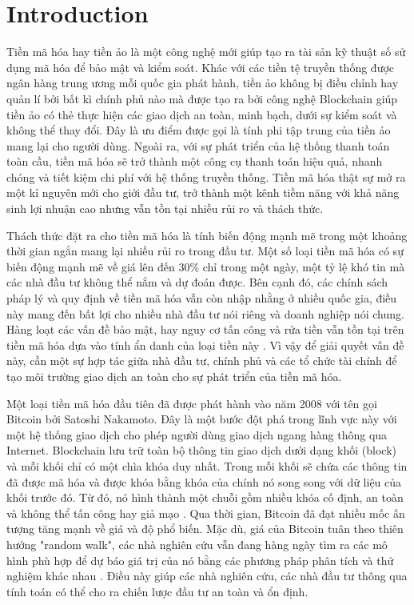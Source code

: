 \documentclass{ieeeojies}
\begin{document}
\titlepgskip=-15pt

\maketitle

\section{Introduction}
\label{sec:introduction}    
Tiền mã hóa hay tiền ảo là một công nghệ mới giúp tạo ra tài sản kỹ thuật số sử dụng mã hóa để bảo mật và kiểm soát. Khác với các tiền tệ truyền thống được ngân hàng trung ương mỗi quốc gia phát hành, tiền ảo không bị điều chỉnh hay quản lí bởi bất kì chính phủ nào mà được tạo ra bởi công nghệ Blockchain giúp tiền ảo có thẻ thực hiện các giao dịch an toàn, minh bạch, dưới sự kiểm soát và không thể thay đổi. Đây là ưu điểm được gọi là tính phi tập trung của tiền ảo mang lại cho người dùng. Ngoài ra, với sự phát triển của hệ thống thanh toán toàn cầu, tiền mã hóa sẽ trở thành một công cụ thanh toán hiệu quả, nhanh chóng và tiết kiệm chi phí với hệ thống truyền thống\cite{b1}. Tiền mã hóa thật sự mở ra một kỉ nguyên mới cho giới đầu tư, trở thành một kênh tiềm năng với khả năng sinh lợi nhuận cao nhưng vẫn tồn tại nhiều rủi ro và thách thức.

Thách thức đặt ra cho tiền mã hóa là tính biến động mạnh mẽ trong một khoảng thời gian ngắn mang lại nhiều rủi ro trong đầu tư. Một số loại tiền mã hóa có sự biến động mạnh mẽ về giá lên đến 30\% chỉ trong một ngày, một tỷ lệ khó tin mà các nhà đầu tư không thể nắm và dự đoán được. Bên cạnh đó, các chính sách pháp lý và quy định về tiền mã hóa vẫn còn nhập nhằng ở nhiều quốc gia, điều này mang đến bất lợi cho nhiều nhà đầu tư nói riêng và doanh nghiệp nói chung. Hàng loạt các vấn đề bảo mật, hay nguy cơ tấn công và rửa tiền vẫn tồn tại trên tiền mã hóa dựa vào tính ẩn danh của loại tiền này \cite{b2}. Vì vậy để giải quyết vấn đề này, cần một sự hợp tác giữa nhà đầu tư, chính phủ và các tổ chức tài chính để tạo môi trường giao dịch an toàn cho sự phát triển của tiền mã hóa.

Một loại tiền mã hóa đầu tiên đã được phát hành vào năm 2008 với tên gọi Bitcoin bởi Satoshi Nakamoto. Đây là một bước đột phá trong lĩnh vực này với một hệ thống giao dịch cho phép người dùng giao dịch ngang hàng thông qua Internet. Blockchain lưu trữ toàn bộ thông tin giao dịch dưới dạng khối (block) và mỗi khối chỉ có một chìa khóa duy nhất. Trong mỗi khối sẽ chứa các thông tin đã được mã hóa và được khóa bằng khóa của chính nó song song với dữ liệu của khối trước đó. Từ đó, nó hình thành một chuỗi gồm nhiều khóa cố định, an toàn và không thể tấn công hay giả mạo \cite{b3}. Qua thời gian, Bitcoin đã đạt nhiều mốc ấn tượng tăng mạnh về giá và độ phổ biến. Mặc dù, giá của Bitcoin tuân theo thiên hướng "random walk", các nhà nghiên cứu vẫn đang hàng ngày tìm ra các mô hình phù hợp để dự báo giá trị của nó bằng các phương pháp phân tích và thử nghiệm khác nhau \cite{b4}. Điều này giúp các nhà nghiên cứu, các nhà đầu tư thông qua tính toán có thể cho ra chiến lược đầu tư an toàn và ổn định.
\end{document}
